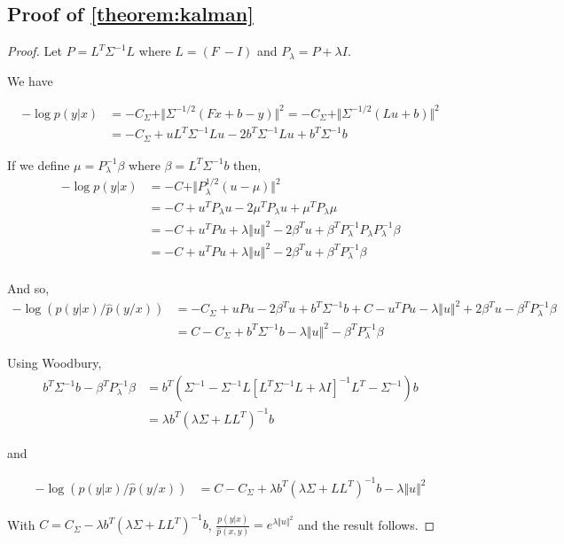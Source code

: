 \subsection{Proof of \cref{theorem:kalman}}\label{sec:proof_kalman}
\begin{proof}
Let $P = L^T\Sigma^{-1}L$ where $L = (F ~-I)$ and $P_\lambda = P + \lambda I$.

We have

\begin{align}
    -\log p(y|x) &= -C_\Sigma + \Vert \Sigma^{-1/2}(Fx + b -y)\Vert^2 = -C_\Sigma + \Vert \Sigma^{-1/2}(Lu + b)\Vert^2\\
                 &= -C_\Sigma + uL^T\Sigma^{-1}Lu - 2b^T\Sigma^{-1}Lu + b^T\Sigma^{-1}b
\end{align}

If we define $\mu = P_{\lambda}^{-1}\beta$ where $\beta = L^T\Sigma^{-1}b$ then,
\begin{align}
    -\log p(y|x) & = -C + \Vert P_\lambda^{1/2}\left(u - \mu\right)\Vert^2\\
                 & = -C + u^T P_\lambda u - 2 \mu^T P_\lambda u + \mu^T P_\lambda \mu\\
                 & = -C + u^TPu + \lambda \Vert u \Vert^2 -2 \beta^Tu + \beta^TP_\lambda^{-1}P_\lambda P_\lambda^{-1}\beta\\
                 & = -C + u^TPu + \lambda \Vert u \Vert^2 -2 \beta^Tu + \beta^TP_\lambda^{-1}\beta\\
\end{align}

And so,
\begin{align}
    - \log(p(y|x)/\hat p(y/x)) &= -C_\Sigma + uPu - 2\beta^Tu + b^T\Sigma^{-1}b + C - u^TPu - \lambda \Vert u \Vert^2 +2 \beta^Tu - \beta^TP_\lambda^{-1}\beta\\
   &= C -C_\Sigma+ b^T\Sigma^{-1}b - \lambda \Vert u \Vert^2 - \beta^TP_\lambda^{-1}\beta
\end{align}

Using Woodbury,
\begin{align}
    b^T \Sigma^{-1}b - \beta^TP_\lambda^{-1}\beta &= b^T\left(\Sigma^{-1} - \Sigma^{-1}L\left[ L^T\Sigma^{-1}L + \lambda I\right]^{-1}L^T-\Sigma^{-1}\right)b\\
    &=\lambda b^T\left( \lambda \Sigma + LL^T\right)^{-1}b
\end{align}

and

\begin{align}
    - \log(p(y|x)/\hat p(y/x)) &= C -C_\Sigma + \lambda b^T\left( \lambda \Sigma + LL^T\right)^{-1}b- \lambda \Vert u \Vert^2
\end{align}

With $C = C_\Sigma - \lambda b^T\left( \lambda \Sigma + LL^T\right)^{-1}b$, $\frac{p(y|x)}{\hat p(x, y)} = e^{\lambda \Vert u \Vert^2}$ and the result follows.
\end{proof}

